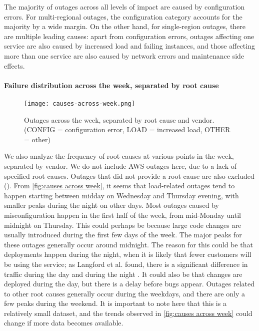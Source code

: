 The majority of outages across all levels of impact are caused by configuration errors.
For multi-regional outages, the configuration category accounts for the majority by a wide margin.
On the other hand, for single-region outages, there are multiple leading causes: apart from configuration errors, outages affecting one service are also caused by increased load and failing instances, and those affecting more than one service are also caused by network errors and maintenance side effects.

\paragraph{Failure distribution across the week, separated by root cause}
\begin{figure}
  \centering
  \texttt{[image: causes-across-week.png]}
  \caption{Outages across the week, separated by root cause and vendor. (CONFIG = configuration error, LOAD = increased load, OTHER = other)}
  \label{fig:causes across week}
\end{figure}

We also analyze the frequency of root causes at various points in the week, separated by vendor.
We do not include AWS outages here, due to a lack of specified root causes.
Outages that did not provide a root cause are also excluded ().
From \autoref{fig:causes across week}, it seems that load-related outages tend to happen starting between midday on Wednesday and Thursday evening, with smaller peaks during the night on other days.
Most outages caused by misconfiguration happen in the first half of the week, from mid-Monday until midnight on Thursday.
This could perhaps be because large code changes are usually introduced during the first few days of the week. %
The major peaks for these outages generally occur around midnight.
The reason for this could be that deployments happen during the night, when it is likely that fewer customers will be using the service; as Langford et al. found, there is a significant difference in traffic during the day and during the night \cite{langford2012}.
It could also be that changes are deployed during the day, but there is a delay before bugs appear.
Outages related to other root causes generally occur during the weekdays, and there are only a few peaks during the weekend.
It is important to note here that this is a relatively small dataset, and the trends observed in \autoref{fig:causes across week} could change if more data becomes available.

